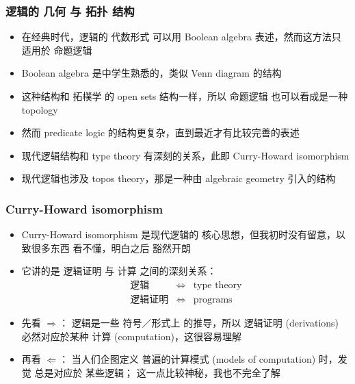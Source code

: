 \documentclass[16pt]{beamer}
\newcommand{\emp}[1]{{\color{violet}#1}}
\begin{document}
\begin{frame}
\frametitle{逻辑的 几何 与 拓扑 结构}
\begin{itemize}
\item 在经典时代，逻辑的 代数形式 可以用 Boolean algebra 表述，然而这方法只适用於 命题逻辑
\item Boolean algebra 是中学生熟悉的，类似 Venn diagram 的结构
\item 这种结构和 拓樸学 的 open sets 结构一样，所以 命题逻辑 也可以看成是一种 topology
\item 然而 predicate logic 的结构更复杂，直到最近才有比较完善的表述
\item 现代逻辑结构和 type theory 有深刻的关系，此即 Curry-Howard isomorphism
\item 现代逻辑也涉及 topos theory，那是一种由 algebraic geometry 引入的结构
\end{itemize}
\end{frame}

\begin{frame}
\frametitle{Curry-Howard isomorphism}
\begin{itemize}
	\item Curry-Howard isomorphism 是现代逻辑的 核心思想，但我初时没有留意，以致很多东西 看不懂，明白之后 豁然开朗
	
	\item 它讲的是 \emp{逻辑证明} 与 \emp{计算} 之间的深刻关系：
	\begin{eqnarray}
	\mbox{逻辑} & \Leftrightarrow & \mbox{type theory} \\
	\mbox{逻辑证明} & \Leftrightarrow & \mbox{programs} \nonumber
	\end{eqnarray}
	
	\item 先看 $\Rightarrow$： 逻辑是一些 符号／形式上 的推导，所以 逻辑证明 (derivations) 必然对应於某种 计算 (computation)，这很容易理解
	
	\item 再看 $\Leftarrow$： 当人们企图定义 普遍的计算模式 (models of computation) 时，发觉 总是对应於 某些逻辑； 这一点比较神秘，我也不完全了解
\end{itemize}
\end{frame}
\end{document}

